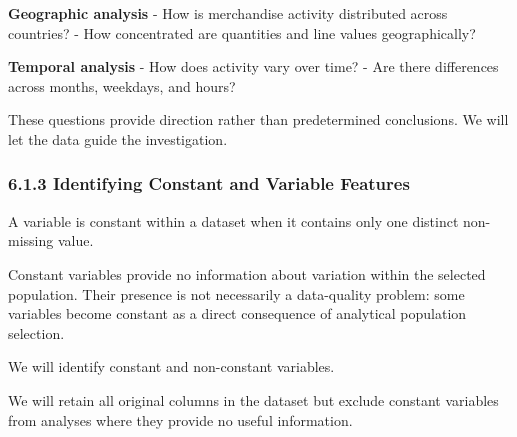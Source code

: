 \documentclass[11pt]{article}
\begin{document}
\textbf{Geographic analysis} - How is merchandise activity distributed
across countries? - How concentrated are quantities and line values
geographically?

\textbf{Temporal analysis} - How does activity vary over time? - Are
there differences across months, weekdays, and hours?

These questions provide direction rather than predetermined conclusions.
We will let the data guide the investigation.

    \subsubsection{6.1.3 Identifying Constant and Variable
Features}\label{identifying-constant-and-variable-features}

A variable is constant within a dataset when it contains only one
distinct non-missing value.

Constant variables provide no information about variation within the
selected population. Their presence is not necessarily a data-quality
problem: some variables become constant as a direct consequence of
analytical population selection.

We will identify constant and non-constant variables.

We will retain all original columns in the dataset but exclude constant
variables from analyses where they provide no useful information.
\end{document}
